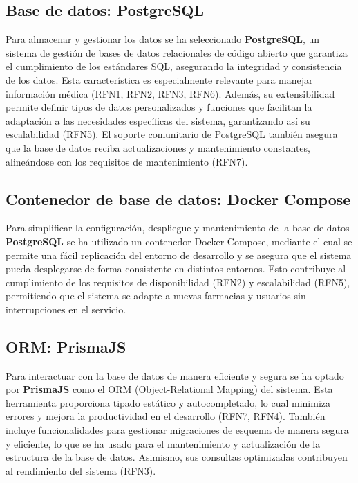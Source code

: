\subsection{Base de datos: PostgreSQL}

Para almacenar y gestionar los datos se ha seleccionado \textbf{PostgreSQL}, un sistema de gestión de bases de datos relacionales de código abierto que garantiza el cumplimiento de los estándares SQL, asegurando la integridad y consistencia de los datos. Esta característica es especialmente relevante para manejar información médica (RFN1, RFN2, RFN3, RFN6). Además, su extensibilidad permite definir tipos de datos personalizados y funciones que facilitan la adaptación a las necesidades específicas del sistema, garantizando así su escalabilidad (RFN5). El soporte comunitario de PostgreSQL también asegura que la base de datos reciba actualizaciones y mantenimiento constantes, alineándose con los requisitos de mantenimiento (RFN7).

\subsection{Contenedor de base de datos: Docker Compose}

Para simplificar la configuración, despliegue y mantenimiento de la base de datos \textbf{PostgreSQL} se ha utilizado un contenedor Docker Compose, mediante el cual se permite una fácil replicación del entorno de desarrollo y se asegura que el sistema pueda desplegarse de forma consistente en distintos entornos. Esto contribuye al cumplimiento de los requisitos de disponibilidad (RFN2) y escalabilidad (RFN5), permitiendo que el sistema se adapte a nuevas farmacias y usuarios sin interrupciones en el servicio.

\subsection{ORM: PrismaJS}

Para interactuar con la base de datos de manera eficiente y segura se ha optado por \textbf{PrismaJS} como el ORM (Object-Relational Mapping) del sistema. Esta herramienta proporciona tipado estático y autocompletado, lo cual minimiza errores y mejora la productividad en el desarrollo (RFN7, RFN4). También incluye funcionalidades para gestionar migraciones de esquema de manera segura y eficiente, lo que se ha usado para el mantenimiento y actualización de la estructura de la base de datos. Asimismo, sus consultas optimizadas contribuyen al rendimiento del sistema (RFN3).

